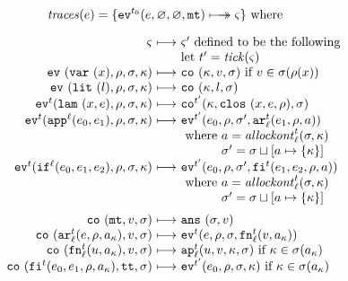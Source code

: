 \documentclass[preprint,onecolumn,9pt]{sigplanconf} %
\begin{document}
\begin{figure}
\begin{gather*}
\begin{align*}
\traces(\mexp) &= \{ \ev[^{\mtcntr}]{\mexp,\varnothing,\varnothing,\kmt} \multimachstep \mstate \} \text{ where }
\end{align*}
\\[2mm]
\begin{array}{@{}r@{\ }c@{\ }l@{}}
\mstate &\machstep&\mstate' \text{ defined to be the following} \\
&&\text{let } \mcntr' =\tick(\mstate) \\
\ev{\svar\mvar,\menv,\msto,\mkont} &\machstep&
\co{\mkont,\mval,\msto}
\text{ if }\mval \in \msto(\menv(\mvar))
\\
\ev{\slit\mlit,\menv,\msto,\mkont} &\machstep&
\co{\mkont,\mlit,\msto}
\\
\ev[^\mcntr]{\slam\mvar\mexp,\menv,\msto,\mkont} &\machstep&
\co[^{\mcntr'}]{\mkont,\clos{\mvar,\mexp,\menv},\msto}
\\
\ev[^\mcntr]{\sapp[^\mlab]{\mexpi0}{\mexpi1},\menv,\msto,\mkont} &\machstep&
\ev[^{\mcntr'}]{\mexpi{0},\menv,\msto',\kar[_\mlab^\mcntr]{\mexpi{1},\menv,\maddr}}
\\
&&
\text{ where }\maddr = \allockont^\mcntr_\mlab(\msto,\mkont) \\
&&\phantom{\text{ where }}\msto' = \msto\sqcup[\maddr \mapsto \setof{\mkont}]
\\
\ev[^\mcntr]{\sif[^\mlab]{\mexpi0}{\mexpi1}{\mexpi2},\menv,\msto,\mkont} &\machstep&
\ev[^{\mcntr'}]{\mexpi0,\menv,\msto',\kif[^\mcntr]{\mexpi1,\mexpi2,\menv,\maddr}}
\\
&&
\text{ where }\maddr = \allockont^\mcntr_\mlab(\msto,\mkont) \\
&&\phantom{\text{ where }}\msto' = \msto\sqcup[\maddr \mapsto \setof{\mkont}]
\\[2mm]
\co{\kmt,\mval,\msto} &\machstep&
\ans{\msto,\mval}
\\
\co{\kar[^\mcntr_\mlab]{\mexp,\menv,\maddr_\mkont},\mval,\msto} & \machstep&
\ev[^\mcntr]{\mexp,\menv,\msto,\kfn[^\mcntr_\mlab]{\mval,\maddr_\mkont}}
\\
\co{\kfn[^\mcntr_\mlab]{{\mvalx{u}},\maddr_\mkont},\mval,\msto} & \machstep&
\ap[^\mcntr_\mlab]{\mvalx{u},\mval,\mkont,\msto}
\text{ if }\mkont \in \msto(\maddr_\mkont)
\\
\co{\kif[^\mcntr]{\mexpi0,\mexpi1,\menv,\maddr_\mkont},\strue,\msto} & \machstep&
\ev[^{\mcntr'}]{\mexpi0,\menv,\msto,\mkont}
\text{ if }\mkont\in\msto(\maddr_\mkont)

\end{array}
\end{gather*}
\end{figure}
\end{document}
